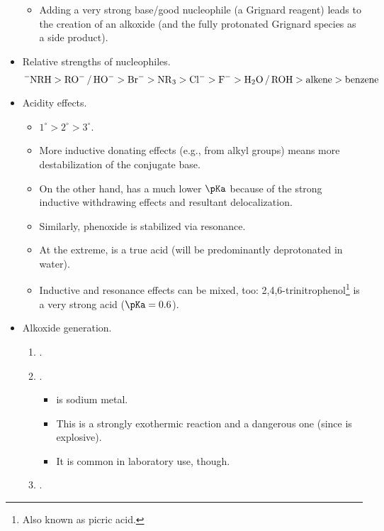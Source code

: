 \documentclass[../notes.tex]{subfiles}
\begin{document}
\begin{itemize}
\begin{itemize}
        \item Adding a very strong base/good nucleophile (a Grignard reagent) leads to the creation of an alkoxide (and the fully protonated Grignard species as a side product).
    \end{itemize}
    \item Relative strengths of nucleophiles.
    \begin{equation*}
        \ce{{}^-NRH} > \ce{RO- / HO-}
        > \ce{Br-}
        > \ce{NR3}
        > \ce{Cl-}
        > \ce{F-}
        > \ce{H2O / ROH}
        > \text{alkene}
        > \text{benzene}
    \end{equation*}
    \item Acidity effects.
    \begin{itemize}
        \item $1^\circ>2^\circ>3^\circ$.
        \item More inductive donating effects (e.g., from alkyl groups) means more destabilization of the conjugate base.
        \item On the other hand,  has a much lower $\pKa$ because of the strong inductive withdrawing effects and resultant delocalization.
        \item Similarly, phenoxide is stabilized via resonance.
        \item At the extreme,  is a true acid (will be predominantly deprotonated in water).
        \item Inductive and resonance effects can be mixed, too: 2,4,6-trinitrophenol\footnote{Also known as picric acid.} is a very strong acid ($\pKa=0.6$).
    \end{itemize}
    \item Alkoxide generation.
    \begin{enumerate}
        \item {}.
        \item {}.
        \begin{itemize}
            \item {} is sodium metal.
            \item This is a strongly exothermic reaction and a dangerous one (since  is explosive).
            \item It is common in laboratory use, though.
        \end{itemize}
        \item {}.

\end{enumerate}
\end{itemize}
\end{document}
